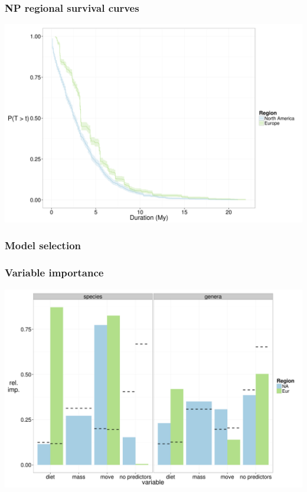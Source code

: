 \documentclass{beamer}
\begin{document}
\begin{frame}
  \frametitle{NP regional survival curves}

  \includegraphics[height=0.8\textheight,width=\textwidth,keepaspectratio=true]{figure/kms_region}

\end{frame}

\begin{frame}
  \frametitle{Model selection}

\end{frame}

\begin{frame}
  \frametitle{Variable importance}
  \includegraphics[height=0.8\textheight,width=\textwidth,keepaspectratio=true]{figure/rel_imp_com}

\end{frame}
\end{document}
